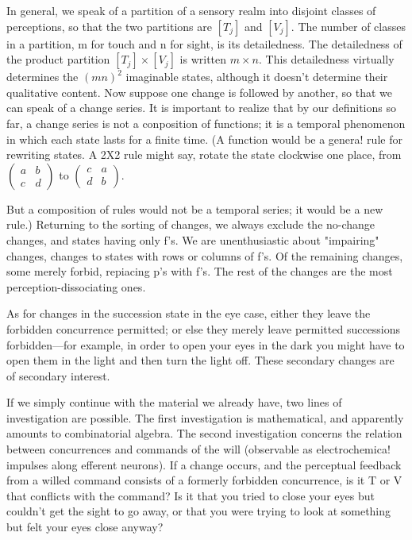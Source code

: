 In general, we speak of a partition of a sensory realm into disjoint 
classes of perceptions, so that the two partitions are $[T_j]$ and $[V_j]$. The 
number of classes in a partition, m for touch and n for sight, is its 
detailedness. The detailedness of the product partition $[T_j]\times [V_j]$ is written 
$m\times n$. This detailedness virtually determines the $(mn)^2$ imaginable states, 
although it doesn't determine their qualitative content. Now suppose one 
change is followed by another, so that we can speak of a change series. It is 
important to realize that by our definitions so far, a change series is not a 
conposition of functions; it is a temporal phenomenon in which each state 
lasts for a finite time. (A function would be a genera! rule for rewriting 
states. A 2X2 rule might say, rotate the state clockwise one place, from
$\begin{pmatrix}a & b \\ c & d\end{pmatrix}$ to
$\begin{pmatrix}c & a \\ d & b\end{pmatrix}$.

But a composition of rules would not be a temporal series; it would be a new 
rule.) Returning to the sorting of changes, we always exclude the no-change 
changes, and states having only f's. We are unenthusiastic about "impairing"
changes, changes to states with rows or columns of f's. Of the remaining 
changes, some merely forbid, repiacing p's with f's. The rest of the changes 
are the most perception-dissociating ones. 

As for changes in the succession state in the eye case, either they leave 
the forbidden concurrence permitted; or else they merely leave permitted 
successions forbidden---for example, in order to open your eyes in the dark 
you might have to open them in the light and then turn the light off. These 
secondary changes are of secondary interest. 

If we simply continue with the material we already have, two lines of 
investigation are possible. The first investigation is mathematical, and 
apparently amounts to combinatorial algebra. The second investigation 
concerns the relation between concurrences and commands of the will 
(observable as electrochemica! impulses along efferent neurons). If a change 
occurs, and the perceptual feedback from a willed command consists of a 
formerly forbidden concurrence, is it T or V that conflicts with the 
command? Is it that you tried to close your eyes but couldn't get the sight 
to go away, or that you were trying to look at something but felt your eyes 
close anyway? 

